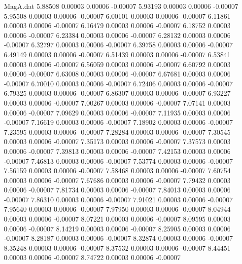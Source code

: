 \begin{filecontents}{MagA.dat}
   5.88508    0.00003    0.00006   -0.00007
   5.93193    0.00003    0.00006   -0.00007
   5.95508    0.00003    0.00006   -0.00007
   6.00101    0.00003    0.00006   -0.00007
   6.11861    0.00003    0.00006   -0.00007
   6.16479    0.00003    0.00006   -0.00007
   6.18752    0.00003    0.00006   -0.00007
   6.23384    0.00003    0.00006   -0.00007
   6.28132    0.00003    0.00006   -0.00007
   6.32797    0.00003    0.00006   -0.00007
   6.39758    0.00003    0.00006   -0.00007
   6.49149    0.00003    0.00006   -0.00007
   6.51439    0.00003    0.00006   -0.00007
   6.53841    0.00003    0.00006   -0.00007
   6.56059    0.00003    0.00006   -0.00007
   6.60792    0.00003    0.00006   -0.00007
   6.63008    0.00003    0.00006   -0.00007
   6.67681    0.00003    0.00006   -0.00007
   6.70010    0.00003    0.00006   -0.00007
   6.72406    0.00003    0.00006   -0.00007
   6.79325    0.00003    0.00006   -0.00007
   6.86307    0.00003    0.00006   -0.00007
   6.93227    0.00003    0.00006   -0.00007
   7.00267    0.00003    0.00006   -0.00007
   7.07141    0.00003    0.00006   -0.00007
   7.09629    0.00003    0.00006   -0.00007
   7.11935    0.00003    0.00006   -0.00007
   7.16619    0.00003    0.00006   -0.00007
   7.18902    0.00003    0.00006   -0.00007
   7.23595    0.00003    0.00006   -0.00007
   7.28284    0.00003    0.00006   -0.00007
   7.30545    0.00003    0.00006   -0.00007
   7.35173    0.00003    0.00006   -0.00007
   7.37573    0.00003    0.00006   -0.00007
   7.39813    0.00003    0.00006   -0.00007
   7.42153    0.00003    0.00006   -0.00007
   7.46813    0.00003    0.00006   -0.00007
   7.53774    0.00003    0.00006   -0.00007
   7.56159    0.00003    0.00006   -0.00007
   7.58468    0.00003    0.00006   -0.00007
   7.60754    0.00003    0.00006   -0.00007
   7.67686    0.00003    0.00006   -0.00007
   7.79432    0.00003    0.00006   -0.00007
   7.81734    0.00003    0.00006   -0.00007
   7.84013    0.00003    0.00006   -0.00007
   7.86310    0.00003    0.00006   -0.00007
   7.91021    0.00003    0.00006   -0.00007
   7.95640    0.00003    0.00006   -0.00007
   7.97950    0.00003    0.00006   -0.00007
   8.04944    0.00003    0.00006   -0.00007
   8.07221    0.00003    0.00006   -0.00007
   8.09595    0.00003    0.00006   -0.00007
   8.14219    0.00003    0.00006   -0.00007
   8.25905    0.00003    0.00006   -0.00007
   8.28187    0.00003    0.00006   -0.00007
   8.32874    0.00003    0.00006   -0.00007
   8.35248    0.00003    0.00006   -0.00007
   8.37532    0.00003    0.00006   -0.00007
   8.44451    0.00003    0.00006   -0.00007
   8.74722    0.00003    0.00006   -0.00007

\end{filecontents}
